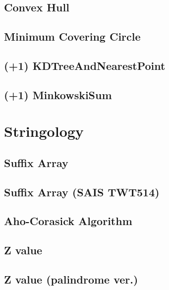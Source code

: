 \documentclass[10pt,twocolumn,oneside]{article}
\begin{document}
\subsection{Convex Hull}


\subsection{Minimum Covering Circle}


\subsection{(+1) KDTreeAndNearestPoint}


\subsection{(+1) MinkowskiSum}


\section{Stringology}
\subsection{Suffix Array}


\subsection{Suffix Array (SAIS TWT514)}


\subsection{Aho-Corasick Algorithm}


\subsection{Z value}


\subsection{Z value (palindrome ver.)}

\end{document}
